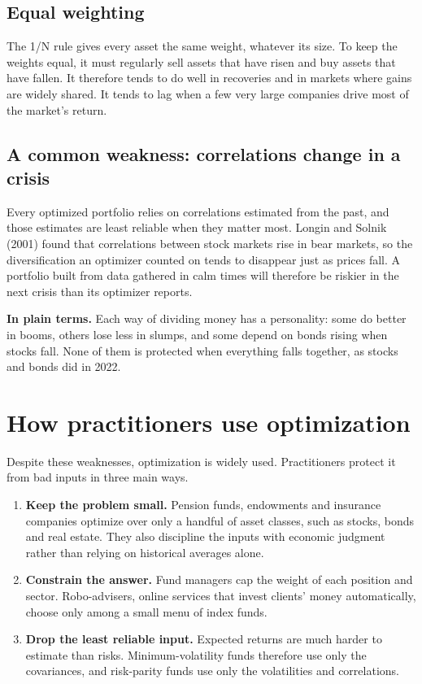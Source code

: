\subsection{Equal weighting}

The 1/N rule gives every asset the same weight, whatever its size. To keep the weights equal, it must regularly sell assets that have risen and buy assets that have fallen. It therefore tends to do well in recoveries and in markets where gains are widely shared. It tends to lag when a few very large companies drive most of the market's return.

\subsection{A common weakness: correlations change in a crisis}

Every optimized portfolio relies on correlations estimated from the past, and those estimates are least reliable when they matter most. Longin and Solnik (2001) found that correlations between stock markets rise in bear markets, so the diversification an optimizer counted on tends to disappear just as prices fall. A portfolio built from data gathered in calm times will therefore be riskier in the next crisis than its optimizer reports.

\noindent\textbf{In plain terms.} Each way of dividing money has a personality: some do better in booms, others lose less in slumps, and some depend on bonds rising when stocks fall. None of them is protected when everything falls together, as stocks and bonds did in 2022.


\section{How practitioners use optimization}
\label{sec:12-practice}

Despite these weaknesses, optimization is widely used. Practitioners protect it from bad inputs in three main ways.

\begin{enumerate}
  \item \textbf{Keep the problem small.} Pension funds, endowments and insurance companies optimize over only a handful of asset classes, such as stocks, bonds and real estate. They also discipline the inputs with economic judgment rather than relying on historical averages alone.
  \item \textbf{Constrain the answer.} Fund managers cap the weight of each position and sector. Robo-advisers, online services that invest clients' money automatically, choose only among a small menu of index funds.
  \item \textbf{Drop the least reliable input.} Expected returns are much harder to estimate than risks. Minimum-volatility funds therefore use only the covariances, and risk-parity funds use only the volatilities and correlations.
\end{enumerate}

